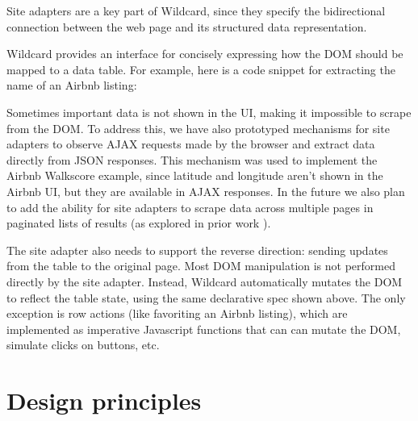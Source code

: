 \documentclass[english,submission]{programming}
\newenvironment{Shaded}{}{}
\newcommand{\CommentTok}[1]{\textcolor[rgb]{0.38,0.63,0.69}{\textit{#1}}}
\newcommand{\FunctionTok}[1]{\textcolor[rgb]{0.02,0.16,0.49}{#1}}
\newcommand{\KeywordTok}[1]{\textcolor[rgb]{0.00,0.44,0.13}{\textbf{#1}}}
\newcommand{\NormalTok}[1]{#1}
\newcommand{\OperatorTok}[1]{\textcolor[rgb]{0.40,0.40,0.40}{#1}}
\newcommand{\SpecialCharTok}[1]{\textcolor[rgb]{0.25,0.44,0.63}{#1}}
\newcommand{\StringTok}[1]{\textcolor[rgb]{0.25,0.44,0.63}{#1}}
\newcommand{\VariableTok}[1]{\textcolor[rgb]{0.10,0.09,0.49}{#1}}
\newcommand{\VerbatimStringTok}[1]{\textcolor[rgb]{0.25,0.44,0.63}{#1}}
\begin{document}
Site adapters are a key part of Wildcard, since they specify the
bidirectional connection between the web page and its structured data
representation.

Wildcard provides an interface for concisely expressing how the DOM
should be mapped to a data table. For example, here is a code snippet
for extracting the name of an Airbnb listing:

\begin{Shaded}
\end{Shaded}

Sometimes important data is not shown in the UI, making it impossible to
scrape from the DOM. To address this, we have also prototyped mechanisms
for site adapters to observe AJAX requests made by the browser and
extract data directly from JSON responses. This mechanism was used to
implement the Airbnb Walkscore example, since latitude and longitude
aren't shown in the Airbnb UI, but they are available in AJAX responses.
In the future we also plan to add the ability for site adapters to
scrape data across multiple pages in paginated lists of results (as
explored in prior work \autocite{huynh2006}).

The site adapter also needs to support the reverse direction: sending
updates from the table to the original page. Most DOM manipulation is
not performed directly by the site adapter. Instead, Wildcard
automatically mutates the DOM to reflect the table state, using the same
declarative spec shown above. The only exception is row actions (like
favoriting an Airbnb listing), which are implemented as imperative
Javascript functions that can can mutate the DOM, simulate clicks on
buttons, etc.

\hypertarget{design-principles}{%
\section{Design principles}\label{design-principles}}
\end{document}
